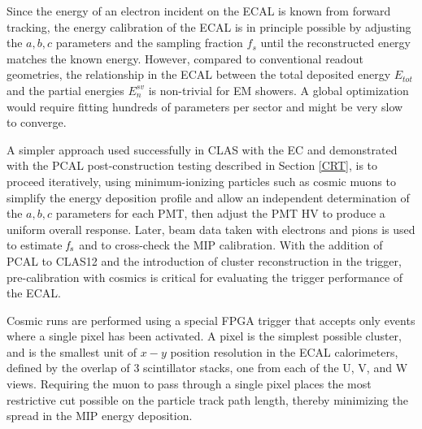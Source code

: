 Since the energy of an electron incident on the ECAL is known from forward tracking, the energy calibration of the
ECAL is in principle possible by adjusting the $a,b,c$ parameters and the sampling fraction $f_{s}$ until the
reconstructed energy matches the known energy. However, compared to conventional readout geometries, the
relationship in the ECAL between the total deposited energy $E_{tot}$ and the partial energies $E_{n}^{sv}$ is
non-trivial for EM showers. A global optimization would require fitting hundreds of parameters per sector and might
be very slow to converge.

A simpler approach used successfully in CLAS with the EC and demonstrated with the PCAL post-construction testing
described in Section \ref{CRT}, is to proceed iteratively, using minimum-ionizing particles such as cosmic muons to
simplify the energy deposition profile and allow an independent determination of the $a,b,c$ parameters for each
PMT, then adjust the PMT HV to produce a uniform overall response. Later, beam data taken with electrons and
pions is used to estimate ${\it f_s}$ and to cross-check the MIP calibration. With the addition of PCAL to CLAS12
and the introduction of cluster reconstruction in the trigger, pre-calibration with cosmics is critical for evaluating
the trigger performance of the ECAL.

Cosmic runs are performed using a special FPGA trigger that accepts only events where a single pixel has been
activated. A pixel is the simplest possible cluster, and is the smallest unit of $x-y$ position resolution in the ECAL
calorimeters, defined by the overlap of 3 scintillator stacks, one from each of the U, V, and W views.  Requiring the
muon to pass through a single pixel places the most restrictive cut possible on the particle track path length,
thereby minimizing the spread in the MIP energy deposition.

